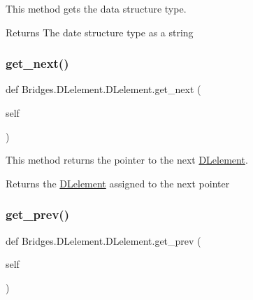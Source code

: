 This method gets the data structure type. 

\begin{DoxyReturn}{Returns}
The date structure type as a string 
\end{DoxyReturn}
\mbox{\label{class_bridges_1_1_d_lelement_1_1_d_lelement_ab3aae005a6e37d25b7d7c6c4cb1bdecf}} 
\subsubsection{\texorpdfstring{get\+\_\+next()}{get\_next()}}
{\footnotesize\ttfamily def Bridges.\+D\+Lelement.\+D\+Lelement.\+get\+\_\+next (\begin{DoxyParamCaption}\item[{}]{self }\end{DoxyParamCaption})}



This method returns the pointer to the next \mbox{\hyperlink{class_bridges_1_1_d_lelement_1_1_d_lelement}{D\+Lelement}}. 

\begin{DoxyReturn}{Returns}
the \mbox{\hyperlink{class_bridges_1_1_d_lelement_1_1_d_lelement}{D\+Lelement}} assigned to the next pointer 
\end{DoxyReturn}
\mbox{\label{class_bridges_1_1_d_lelement_1_1_d_lelement_a012742f29626676f4e99d1f54e9dd10d}} 
\subsubsection{\texorpdfstring{get\+\_\+prev()}{get\_prev()}}
{\footnotesize\ttfamily def Bridges.\+D\+Lelement.\+D\+Lelement.\+get\+\_\+prev (\begin{DoxyParamCaption}\item[{}]{self }\end{DoxyParamCaption})}



